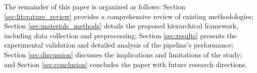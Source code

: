 \begin{sloppypar}
The remainder of this paper is organized as follows: Section \ref{sec:literature_review} provides a comprehensive review of existing methodologies; Section \ref{sec:materials_methods} details the proposed hierarchical framework, including data collection and preprocessing; Section \ref{sec:results} presents the experimental validation and detailed analysis of the pipeline's performance; Section \ref{sec:discussion} discusses the implications and limitations of the study; and Section \ref{sec:conclusion} concludes the paper with future research directions.
\end{sloppypar}
